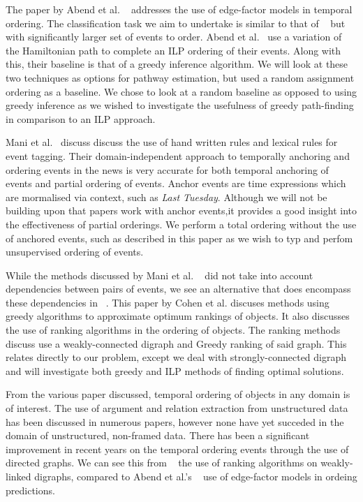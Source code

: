 \documentclass[bsc,frontabs,twoside,singlespacing,parskip,deptreport]{infthesis}     %
\begin{document}
The paper by  Abend et al. ~\cite{abend2015lexical} addresses the use of
edge-factor models in temporal ordering. The classification task we aim to undertake is similar to that of ~\cite{abend2015lexical}
but with significantly larger set of events to order.
Abend et al.~\cite{abend2015lexical} use a variation of the Hamiltonian path
to complete an ILP ordering of their events. Along with this, their baseline is that of a greedy inference algorithm.
We will look at these two techniques as options for pathway estimation, but used a random assignment ordering as
a baseline. We chose to look at a random baseline as opposed to using greedy inference as
we wished to investigate the usefulness of greedy path-finding in comparison to an ILP approach.

Mani et al.~\cite{mani2006machine} discuss discuss the use of hand written rules and lexical rules for event tagging.
Their domain-independent approach to temporally anchoring and ordering events in the news is very accurate for both temporal
anchoring of events and partial ordering of events. Anchor events are time expressions which are mormalised via
context, such as \textit{Last Tuesday}. Although we will not be building upon that papers work with
anchor events,it provides a good insight into the effectiveness of
partial orderings. We perform a total ordering without the use of anchored events, such as described in this paper
as we wish to typ and perfom unsupervised ordering of events.

While the methods discussed by Mani et al. ~\cite{mani2006machine} did not take into account dependencies between pairs of events, 
we see an alternative that does encompass
these dependencies in ~\cite{schapire1998learning}.
This paper by Cohen et al. discuses methods using greedy algorithms to approximate optimum rankings of objects.
It also discusses the use of ranking algorithms in the ordering of objects. The ranking methods discuss use a
weakly-connected digraph and Greedy ranking of said graph. This relates directly to our problem,
except we deal with strongly-connected digraph and will investigate both greedy and ILP methods of finding
optimal solutions.


From the various paper discussed, temporal ordering of objects in any domain is of interest.
The use of argument and relation extraction from unstructured data has been discussed in numerous papers,
however none have yet succeded in the domain of unstructured, non-framed data.
There has been a significant improvement in recent years on the temporal ordering events through the use of
directed graphs. We can see this from ~\cite{schapire1998learning} the use of ranking algorithms on weakly-linked
digraphs, compared to Abend et al.'s ~\cite{abend2015lexical} use of edge-factor models in ordeing predictions. 
\end{document}
